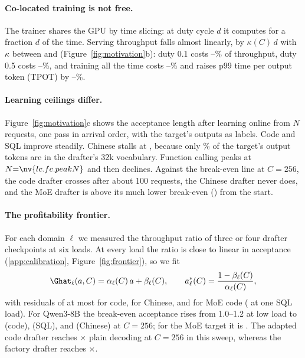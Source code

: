 \paragraph{Co-located training is not free.} The trainer shares the GPU by time slicing: at duty cycle $d$ it computes for a fraction $d$ of the time. Serving throughput falls almost linearly, by $\kappa(C)\,d$ with $\kappa$ between  and  (Figure~\ref{fig:motivation}b): duty 0.1 costs --\% of throughput, duty 0.5 costs --\%, and training all the time costs --\% and raises p99 time per output token (TPOT) by --\%.

\paragraph{Learning ceilings differ.} Figure~\ref{fig:motivation}c shows the acceptance length after learning online from $N$ requests, one pass in arrival order, with the target's outputs as labels. Code and SQL improve steadily. Chinese stalls at , because only \% of the target's output tokens are in the drafter's 32k vocabulary. Function calling peaks at $N{=}\nv{lc.fc.peakN}$ and then declines. Against the break-even line at $C{=}256$, the code drafter crosses after about 100 requests, the Chinese drafter never does, and the MoE drafter is above its much lower break-even () from the start.

\paragraph{The profitability frontier.} For each domain $\ell$ we measured the throughput ratio of three or four drafter checkpoints at six loads. At every load the ratio is close to linear in acceptance (\cref{app:calibration}, Figure~\ref{fig:frontier}), so we fit
\begin{equation}
\Ghat_\ell(a,C)=\alpha_\ell(C)\,a+\beta_\ell(C),\qquad a^{*}_\ell(C)=\frac{1-\beta_\ell(C)}{\alpha_\ell(C)},\label{eq:frontier}
\end{equation}
with residuals of at most  for code,  for Chinese, and  for MoE code ( at one SQL load). For Qwen3-8B the break-even acceptance rises from 1.0--1.2 at low load to  (code),  (SQL), and  (Chinese) at $C{=}256$; for the MoE target it is . The adapted code drafter reaches $\times$ plain decoding at $C{=}256$ in this sweep, whereas the factory drafter reaches $\times$.
